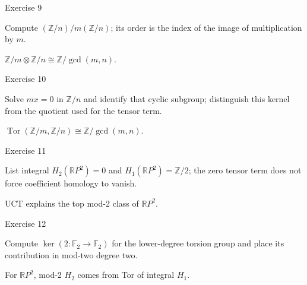\begin{exercise}\label{exr:viii26-09}
Exercise 9
\end{exercise}
\begin{hint}
Compute \((\mathbb Z/n)/m(\mathbb Z/n)\); its order is the index of the image of multiplication by \(m\).
\end{hint}
\begin{solution}
\(\mathbb Z/m\otimes\mathbb Z/n\cong\mathbb Z/\gcd(m,n)\).
\end{solution}

\begin{exercise}\label{exr:viii26-10}
Exercise 10
\end{exercise}
\begin{hint}
Solve \(mx=0\) in \(\mathbb Z/n\) and identify that cyclic subgroup; distinguish this kernel from the quotient used for the tensor term.
\end{hint}
\begin{solution}
\(\operatorname{Tor}(\mathbb Z/m,\mathbb Z/n)\cong\mathbb Z/\gcd(m,n)\).
\end{solution}

\begin{exercise}\label{exr:viii26-11}
Exercise 11
\end{exercise}
\begin{hint}
List integral \(H_2(\mathbb RP^2)=0\) and \(H_1(\mathbb RP^2)=\mathbb Z/2\); the zero tensor term does not force coefficient homology to vanish.
\end{hint}
\begin{solution}
UCT explains the top mod-2 class of \(\mathbb RP^2\).
\end{solution}

\begin{exercise}\label{exr:viii26-12}
Exercise 12
\end{exercise}
\begin{hint}
Compute \(\ker(2:\mathbb F_2\to\mathbb F_2)\) for the lower-degree torsion group and place its contribution in mod-two degree two.
\end{hint}
\begin{solution}
For \(\mathbb RP^2\), mod-2 \(H_2\) comes from Tor of integral \(H_1\).
\end{solution}

